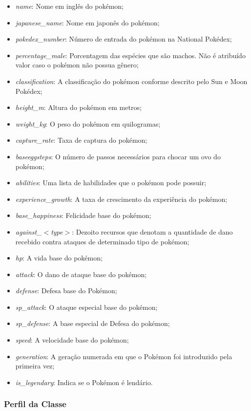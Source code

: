 \documentclass[12pt]{article}
\begin{document}
\begin{itemize}
    \item \emph{name}: Nome em inglês do pokémon;
    \item \emph{japanese\_name}: Nome em japonês do pokémon;
    \item \emph{pokedex\_number}: Número de entrada do pokémon na National Pokédex;
    \item \emph{percentage\_male}: Porcentagem das espécies que são machos. Não é atribuído valor caso o pokémon não possua gênero;
    \item \emph{classification}: A classificação do pokémon conforme descrito pelo Sun e Moon Pokédex;
    \item \emph{height\_m}: Altura do pokémon em metros;
    \item \emph{weight\_kg}: O peso do pokémon em quilogramas;
    \item \emph{capture\_rate}: Taxa de captura do pokémon;
    \item \emph{baseeggsteps}: O número de passos necessários para chocar um ovo do pokémon;
    \item \emph{abilities}: Uma lista de habilidades que o pokémon pode possuir;
    \item \emph{experience\_growth}: A taxa de crescimento da experiência do pokémon;
    \item \emph{base\_happiness}: Felicidade base do pokémon;
    \item \emph{against\_\(<\)type\(>\)}: Dezoito recursos que denotam a quantidade de dano recebido contra ataques de determinado tipo de pokémon;
    \item \emph{hp}: A vida base do pokémon;
    \item \emph{attack}: O dano de ataque base do pokémon;
    \item \emph{defense}: Defesa base do Pokémon;
    \item \emph{sp\_attack}: O ataque especial base do pokémon;
    \item \emph{sp\_defense}: A base especial de Defesa do pokémon;
    \item \emph{speed}: A velocidade base do pokémon;
    \item \emph{generation}: A geração numerada em que o Pokémon foi introduzido pela primeira vez;
    \item \emph{is\_legendary}: Indica se o Pokémon é lendário.
\end{itemize}

\subsubsection{Perfil da Classe}
\end{document}
